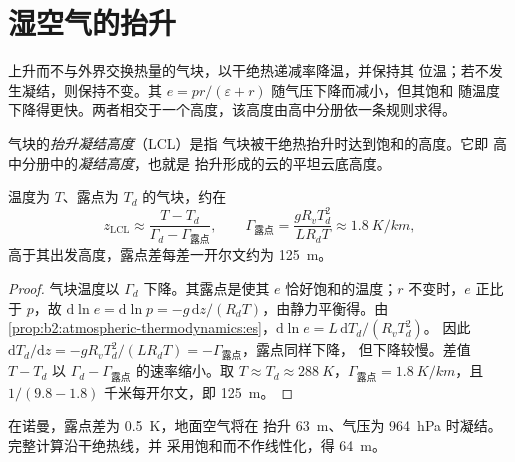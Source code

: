 \section{湿空气的抬升}\label{sec:b2:atmospheric-thermodynamics:ascent}

上升而不与外界交换热量的气块，以干绝热递减率降温，并保持其
位温；若不发生凝结，则保持不变。其
$e = pr/(\varepsilon + r)$ 随气压下降而减小，但其饱和
随温度下降得更快。两者相交于一个高度，该高度由高中分册依一条规则求得。

\begin{definition}[抬升凝结高度]\label{def:b2:atmospheric-thermodynamics:lcl}
气块的\emph{抬升凝结高度}（LCL）是指
气块被干绝热抬升时达到饱和的高度。它即
高中分册中的\emph{凝结高度}，也就是
抬升形成的云的平坦云底高度。
\end{definition}

\begin{proposition}[抬升凝结高度的估算]\label{prop:b2:atmospheric-thermodynamics:lcl}
温度为 $T$、露点为 $T_d$ 的气块，约在
\[
  z_{\text{LCL}} \approx \frac{T - T_d}{\Gamma_d - \Gamma_{\text{露点}}}, \qquad
  \Gamma_{\text{露点}} = \frac{g R_v T_d^2}{L R_d T} \approx \qty{1.8}{K/km},
\]
高于其出发高度，露点差每差一开尔文约为 \qty{125}{m}。
\end{proposition}

\begin{proof}
气块温度以 $\Gamma_d$ 下降。其露点是使其
$e$ 恰好饱和的温度；$r$ 不变时，$e$ 正比于 $p$，故
$\mathrm{d}\ln e = \mathrm{d}\ln p = -g\,\mathrm{d}z/(R_dT)$，由静力平衡得。由
\cref{prop:b2:atmospheric-thermodynamics:es}，$\mathrm{d}\ln e = L\,\mathrm{d}T_d/(R_vT_d^2)$。
因此 $\mathrm{d}T_d/\mathrm{d}z = -gR_vT_d^2/(LR_dT) = -\Gamma_{\text{露点}}$，露点同样下降，
但下降较慢。差值 $T - T_d$ 以 $\Gamma_d - \Gamma_{\text{露点}}$ 的速率缩小。取
$T \approx T_d \approx \qty{288}{K}$，$\Gamma_{\text{露点}} = \qty{1.8}{K/km}$，且 $1/(9.8 - 1.8)$
千米每开尔文，即 \qty{125}{m}。
\end{proof}

在诺曼，露点差为 \qty{0.5}{K}，地面空气将在
抬升 \qty{63}{m}、气压为 \qty{964}{hPa} 时凝结。完整计算沿干绝热线，并
采用饱和而不作线性化，得 \qty{64}{m}。

